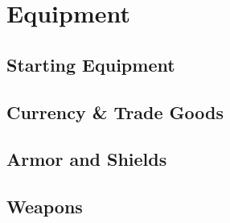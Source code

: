 \chapter{Equipment} \label{ch::equipment}
\section{Starting Equipment} \label{sec::starting}
\section{Currency \& Trade Goods} \label{sec::currency}
\section{Armor and Shields} \label{sec::armor}
\section{Weapons} \label{sec::weapons}


